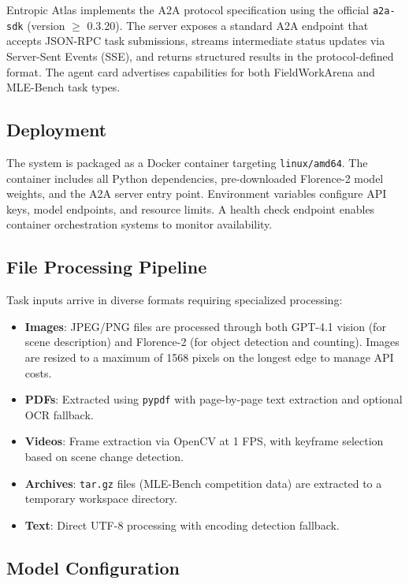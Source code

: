 \documentclass[11pt]{article}
\begin{document}
Entropic Atlas implements the A2A protocol specification using the official \texttt{a2a-sdk} (version $\geq$ 0.3.20). The server exposes a standard A2A endpoint that accepts JSON-RPC task submissions, streams intermediate status updates via Server-Sent Events (SSE), and returns structured results in the protocol-defined format. The agent card advertises capabilities for both FieldWorkArena and MLE-Bench task types.

\subsection{Deployment}

The system is packaged as a Docker container targeting \texttt{linux/amd64}. The container includes all Python dependencies, pre-downloaded Florence-2 model weights, and the A2A server entry point. Environment variables configure API keys, model endpoints, and resource limits. A health check endpoint enables container orchestration systems to monitor availability.

\subsection{File Processing Pipeline}

Task inputs arrive in diverse formats requiring specialized processing:

\begin{itemize}[leftmargin=*,itemsep=1pt]
  \item \textbf{Images}: JPEG/PNG files are processed through both GPT-4.1 vision (for scene description) and Florence-2 (for object detection and counting). Images are resized to a maximum of 1568 pixels on the longest edge to manage API costs.
  \item \textbf{PDFs}: Extracted using \texttt{pypdf} with page-by-page text extraction and optional OCR fallback.
  \item \textbf{Videos}: Frame extraction via OpenCV at 1 FPS, with keyframe selection based on scene change detection.
  \item \textbf{Archives}: \texttt{tar.gz} files (MLE-Bench competition data) are extracted to a temporary workspace directory.
  \item \textbf{Text}: Direct UTF-8 processing with encoding detection fallback.
\end{itemize}

\subsection{Model Configuration}
\end{document}
